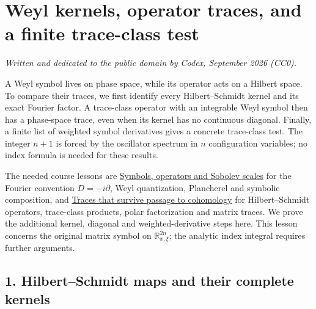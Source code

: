 \documentclass[
  11pt,
]{article}
\author{}
\date{}
\begin{document}
\section{Weyl kernels, operator traces, and a finite trace-class
test}\label{weyl-kernels-operator-traces-and-a-finite-trace-class-test}

\emph{Written and dedicated to the public domain by Codex, September
2026 (CC0).}

A Weyl symbol lives on phase space, while its operator acts on a Hilbert
space. To compare their traces, we first identify every Hilbert--Schmidt
kernel and its exact Fourier factor. A trace-class operator with an
integrable Weyl symbol then has a phase-space trace, even when its
kernel has no continuous diagonal. Finally, a finite list of weighted
symbol derivatives gives a concrete trace-class test. The integer
\(n+1\) is forced by the oscillator spectrum in \(n\) configuration
variables; no index formula is needed for these results.

The needed course lessons are
\href{euclidean-symbol-calculus.pdf}{Symbols, operators and Sobolev
scales} for the Fourier convention \(D=-i\partial\), Weyl quantization,
Plancherel and symbolic composition, and
\href{traces-and-complexes.pdf}{Traces that survive passage to
cohomology} for Hilbert--Schmidt operators, trace-class products, polar
factorization and matrix traces. We prove the additional kernel,
diagonal and weighted-derivative steps here. This lesson concerns the
original matrix symbol on \(\mathbb R^{2n}_{x,\xi}\); the analytic index
integral requires further arguments.

\subsection{1. Hilbert--Schmidt maps and their complete
kernels}\label{hilbertschmidt-maps-and-their-complete-kernels}
\end{document}
